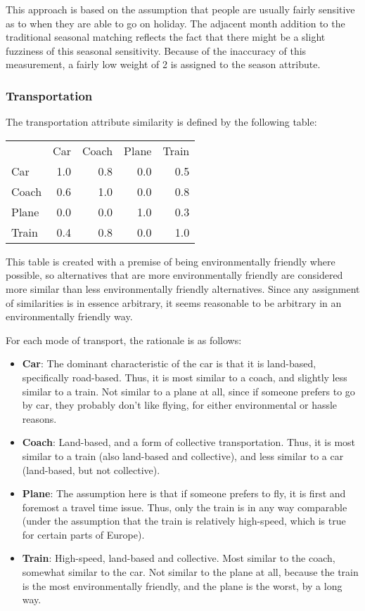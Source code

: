 \documentclass[11pt]{article}
\begin{document}
This approach is based on the assumption that people are usually
fairly sensitive as to when they are able to go on holiday. The
adjacent month addition to the traditional seasonal matching reflects
the fact that there might be a slight fuzziness of this seasonal
sensitivity. Because of the inaccuracy of this measurement, a fairly
low weight of 2 is assigned to the season attribute.

\subsubsection{Transportation}
The transportation attribute similarity is defined by the following
table:


\begin{center}
\begin{tabular}{l|rrrr}
        &  Car  &  Coach  &  Plane  &  Train  \hline\\
 Car    &  1.0  &    0.8  &    0.0  &    0.5  \\
 Coach  &  0.6  &    1.0  &    0.0  &    0.8  \\
 Plane  &  0.0  &    0.0  &    1.0  &    0.3  \\
 Train  &  0.4  &    0.8  &    0.0  &    1.0  \\
\end{tabular}
\end{center}



This table is created with a premise of being environmentally friendly
where possible, so alternatives that are more environmentally
friendly are considered more similar than less environmentally
friendly alternatives. Since any assignment of similarities is in
essence arbitrary, it seems reasonable to be arbitrary in an
environmentally friendly way.

For each mode of transport, the rationale is as follows:

\begin{itemize}
\item \textbf{Car}: The dominant characteristic of the car is that it is
  land-based, specifically road-based. Thus, it is most similar to a
  coach, and slightly less similar to a train. Not similar to a plane
  at all, since if someone prefers to go by car, they probably don't
  like flying, for either environmental or hassle reasons.
\item \textbf{Coach}: Land-based, and a form of collective transportation. Thus,
  it is most similar to a train (also land-based and collective), and
  less similar to a car (land-based, but not collective).
\item \textbf{Plane}: The assumption here is that if someone prefers to fly, it
  is first and foremost a travel time issue. Thus, only the train
  is in any way comparable (under the assumption that the train is
  relatively high-speed, which is true for certain parts of Europe).
\item \textbf{Train}: High-speed, land-based and collective. Most similar to the
  coach, somewhat similar to the car. Not similar to the plane at all,
  because the train is the most environmentally friendly, and the
  plane is the worst, by a long way.
\end{itemize}
\end{document}
